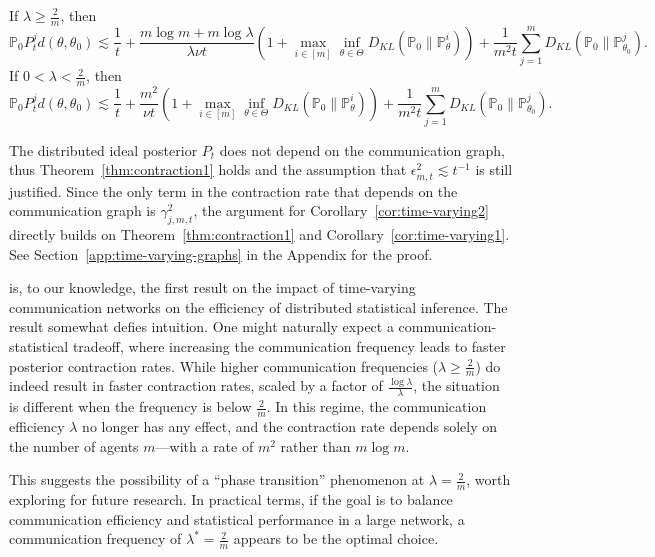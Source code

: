 \documentclass[twoside,11pt]{article}
\numberwithin{equation}{section}
\newcommand\bP{\mathbb{P}}
\begin{document}
{\begin{corollary}
If $\lambda \geq \frac{2}{m}$, then
\begin{equation*}
    \bP_0 P_t^j d(\theta, \theta_0) \lesssim  \frac{1}{t} + \frac{m \log m + m \log \lambda}{\lambda \nu t} \left(1 +  \max_{i \in [m]}\inf_{\theta \in \Theta} D_{KL}(\bP_0 \parallel \bP_\theta^i) \right) + \frac{1}{m^2 t} \sum_{j = 1}^m D_{KL}(\bP_0 \parallel \bP_{\theta_0}^j). 
\end{equation*}
If $0<\lambda < \frac{2}{m}$, then
\begin{equation*}
    \bP_0 P_t^j d(\theta, \theta_0) \lesssim  \frac{1}{t} +\frac{m^2}{\nu t} \left(1 +  \max_{i \in [m]}\inf_{\theta \in \Theta} D_{KL}(\bP_0 \parallel \bP_\theta^i) \right) + \frac{1}{m^2 t} \sum_{j = 1}^m D_{KL}(\bP_0 \parallel \bP_{\theta_0}^j). 
\end{equation*}
\end{corollary}
The distributed ideal posterior $P_t$ does not depend on the communication graph, thus Theorem~\ref{thm:contraction1} holds and the assumption that $\epsilon_{m,t}^2 \lesssim t^{-1}$ is still justified. Since the only term in the contraction rate that depends on the communication graph is $\gamma_{j,m,t}^2$, the argument for Corollary~\ref{cor:time-varying2} directly builds on Theorem~\ref{thm:contraction1} and Corollary~\ref{cor:time-varying1}.  See Section~\ref{app:time-varying-graphs} in the Appendix for the proof. 

 is, to our knowledge, the first result on the impact of time-varying communication networks on the efficiency of distributed statistical inference. The result somewhat defies intuition. One might naturally expect a communication-statistical tradeoff, where increasing the communication frequency leads to faster posterior contraction rates. While higher communication frequencies ($\lambda \geq \frac{2}{m}$) do indeed result in faster contraction rates, scaled by a factor of $\frac{\log \lambda}{\lambda}$, the situation is different when the frequency is below $\frac{2}{m}$. In this regime, the communication efficiency $\lambda$ no longer has any effect, and the contraction rate depends solely on the number of agents $m$—with a rate of $m^2$ rather than $m \log m$.

This suggests the possibility of a ``phase transition'' phenomenon at $\lambda = \frac{2}{m}$, worth exploring for future research. In practical terms, if the goal is to balance communication efficiency and statistical performance in a large network, a communication frequency of $\lambda^* = \frac{2}{m}$ appears to be the optimal choice.
}
\end{document}
